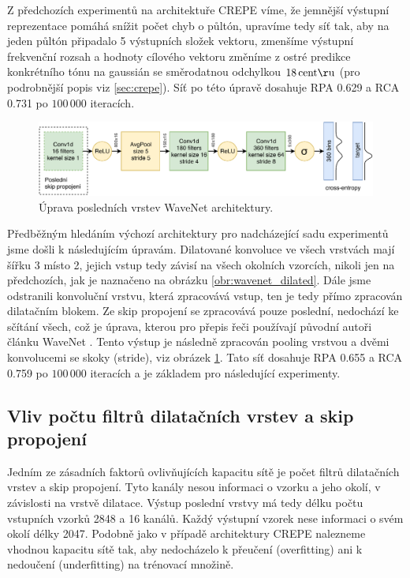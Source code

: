 Z předchozích experimentů na architektuře CREPE víme, že jemnější výstupní reprezentace pomáhá snížit počet chyb o půltón, upravíme tedy síť tak, aby na jeden půltón připadalo 5 výstupních složek vektoru, zmenšíme výstupní frekvenční rozsah a hodnoty cílového vektoru změníme z ostré predikce konkrétního tónu na  gaussián se směrodatnou odchylkou $18\,\rm centů$ (pro podrobnější popis viz \ref{sec:crepe}). Síť po této úpravě dosahuje RPA 0.629 a RCA 0.731 po $100\,000$ iteracích. 

\begin{figure}[h]\centering
    \includegraphics[scale=0.8]{../img/wavenet_lastlayer}
    \caption{Úprava posledních vrstev WaveNet architektury.}\label{obr:wavenet_lastlayer}
\end{figure}

Předběžným hledáním výchozí architektury pro nadcházející sadu experimentů jsme došli k následujícím úpravám. Dilatované konvoluce ve všech vrstvách mají šířku 3 místo 2, jejich vstup tedy závisí na všech okolních vzorcích, nikoli jen na předchozích, jak je naznačeno na obrázku \ref{obr:wavenet_dilated}. Dále jsme odstranili konvoluční vrstvu, která zpracovává vstup, ten je tedy přímo zpracován dilatačním blokem. Ze skip propojení se zpracovává pouze poslední, nedochází ke sčítání všech, což je úprava, kterou pro přepis řeči používají původní autoři článku WaveNet \cite{Oord2016}. Tento výstup je následně zpracován pooling vrstvou a dvěmi konvolucemi se skoky (stride), viz obrázek \ref{obr:wavenet_lastlayer}. Tato síť dosahuje RPA 0.655 a RCA 0.759 po $100\,000$ iteracích a je základem pro následující experimenty. 

\subsection{Vliv počtu filtrů dilatačních vrstev a skip propojení}

Jedním ze zásadních faktorů ovlivňujících kapacitu sítě je počet filtrů dilatačních vrstev a skip propojení. Tyto kanály nesou informaci o vzorku a jeho okolí, v závislosti na vrstvě dilatace. Výstup poslední vrstvy má tedy délku počtu vstupních vzorků 2848 a 16 kanálů. Každý výstupní vzorek nese informaci o svém okolí délky 2047. Podobně jako v případě architektury CREPE nalezneme vhodnou kapacitu sítě tak, aby nedocházelo k přeučení (overfitting) ani k nedoučení (underfitting) na trénovací množině.

